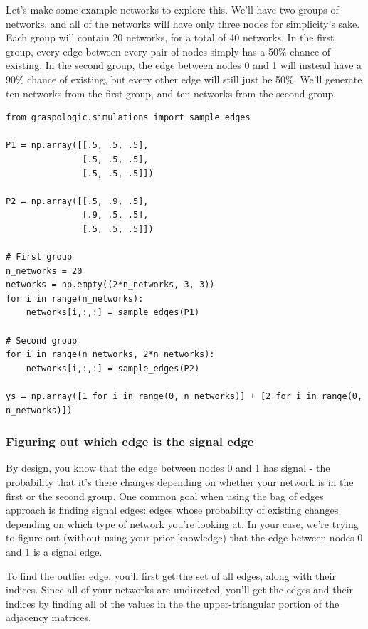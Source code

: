 Let's make some example networks to explore this. We'll have two groups of networks, and all of the networks will have only three nodes for simplicity's sake. Each group will contain 20 networks, for a total of 40 networks. In the first group, every edge between every pair of nodes simply has a 50\% chance of existing. In the second group, the edge between nodes 0 and 1 will instead have a 90\% chance of existing, but every other edge will still just be 50\%. We'll generate ten networks from the first group, and ten networks from the second group.

\begin{lstlisting}[style=python]
from graspologic.simulations import sample_edges

P1 = np.array([[.5, .5, .5],
               [.5, .5, .5],
               [.5, .5, .5]])

P2 = np.array([[.5, .9, .5],
               [.9, .5, .5],
               [.5, .5, .5]])

# First group
n_networks = 20
networks = np.empty((2*n_networks, 3, 3))
for i in range(n_networks):
    networks[i,:,:] = sample_edges(P1)

# Second group
for i in range(n_networks, 2*n_networks):
    networks[i,:,:] = sample_edges(P2)

ys = np.array([1 for i in range(0, n_networks)] + [2 for i in range(0, n_networks)])
\end{lstlisting}

\subsubsection{Figuring out which edge is the signal edge}

By design, you know that the edge between nodes 0 and 1 has signal - the probability that it's there changes depending on whether your network is in the first or the second group. One common goal when using the bag of edges approach is finding signal edges: edges whose probability of existing changes depending on which type of network you're looking at. In your case, we're trying to figure out (without using your prior knowledge) that the edge between nodes 0 and 1 is a signal edge.

To find the outlier edge, you'll first get the set of all edges, along with their indices. Since all of your networks are undirected, you'll get the edges and their indices by finding all of the values in the the upper-triangular portion of the adjacency matrices.

